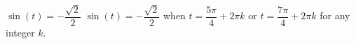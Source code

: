 {$\sin(t) = -\dfrac{\sqrt{2}}{2}$}
{$\sin(t) = -\dfrac{\sqrt{2}}{2}$ when $t = \dfrac{5\pi}{4} + 2\pi k$ or $t = \dfrac{7\pi}{4} + 2\pi k$ for any integer $k$.}
